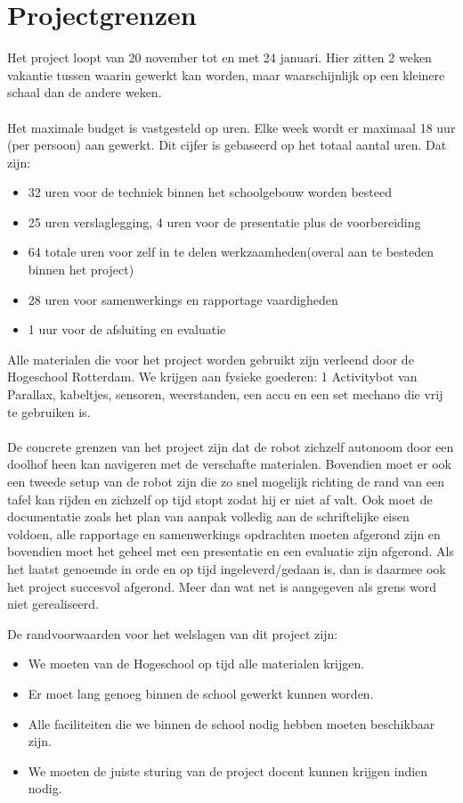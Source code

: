 \documentclass[oneside]{book}
\begin{document}
\clearpage
\chapter{Projectgrenzen}
{\color{red}Het project loopt van 20 november tot en met 24 januari. Hier zitten 2 weken vakantie tussen
waarin gewerkt kan worden, maar waarschijnlijk op een kleinere schaal dan de andere weken.}\\
\\
{\color{red}Het maximale budget is vastgesteld op uren. Elke week wordt er maximaal 18 uur (per persoon) aan gewerkt.}
Dit cijfer is gebaseerd op het totaal aantal uren.
Dat zijn: 
\begin{itemize}
\item 32 uren voor de techniek binnen het schoolgebouw worden besteed
\item {\color{red}25 uren verslaglegging, 4 uren voor de presentatie plus de voorbereiding}
\item 64 totale uren voor zelf in te delen werkzaamheden(overal aan te besteden binnen het project)
\item {\color{red}28 uren voor samenwerkings en rapportage vaardigheden}
\item 1 uur voor de afsluiting en evaluatie
\end{itemize}
Alle materialen die voor het project worden gebruikt zijn verleend door de Hogeschool
Rotterdam.
We krijgen aan fysieke goederen: 1 Activitybot van Parallax, kabeltjes, sensoren, weerstanden, een
accu en een set mechano die vrij te gebruiken is.\\
\\
{\color{red}De concrete grenzen van het project zijn dat de robot zichzelf autonoom door een doolhof heen kan navigeren met de verschafte materialen.}
{\color{red}Bovendien moet er ook een tweede setup van de robot zijn die zo snel}
mogelijk richting de rand van een tafel kan rijden en zichzelf op tijd stopt zodat hij er niet af valt.
Ook moet de documentatie zoals het plan van aanpak volledig aan de schriftelijke eisen voldoen, alle rapportage {\color{red} en samenwerkings opdrachten moeten}
afgerond zijn en bovendien moet het geheel met een presentatie en een evaluatie zijn afgerond.
Als het laatst genoemde in orde en op tijd ingeleverd/gedaan is, dan is daarmee ook het project
succesvol afgerond.
Meer dan wat net is aangegeven als grens word niet gerealiseerd.

De randvoorwaarden voor het welslagen van dit project zijn: 
\begin{itemize}
\item We moeten van de Hogeschool op tijd alle materialen krijgen.
\item Er moet lang genoeg binnen de school gewerkt kunnen worden.
\item Alle faciliteiten die we binnen de school nodig hebben moeten beschikbaar zijn.
\item We moeten de juiste sturing van de project docent kunnen krijgen indien nodig.
\end{itemize}
\clearpage
\end{document}
